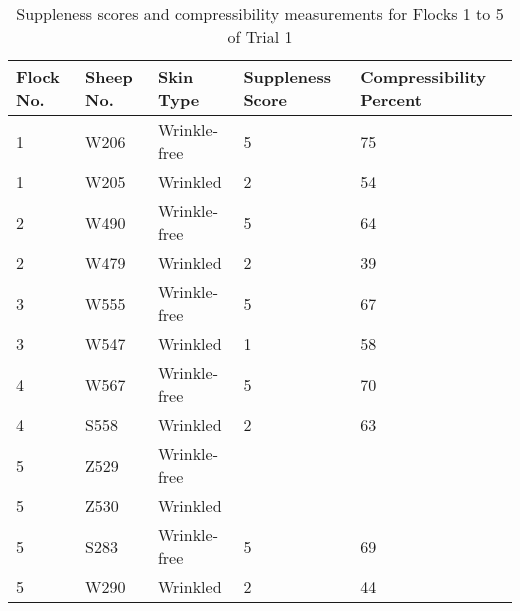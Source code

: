 %

\begin{table}[htp]
\centering
\caption{Suppleness scores and compressibility measurements for Flocks 1 to 5 of Trial 1}
\label{tab:macro}
\vspace{0.1in}
\begin{tabular}{|p{0.6in}|p{0.6in}|p{0.8in}|p{0.8in}|p{0.9in}|}  \hline
     Flock No. & Sheep No.  &  Skin Type & Suppleness Score & Compressibility Percent \\ 
\hline
  1 & W206 & Wrinkle-free & 5 & 75 \\
  1 & W205 & Wrinkled     & 2 & 54 \\
  2 & W490 & Wrinkle-free & 5 & 64 \\
  2 & W479 & Wrinkled     & 2 & 39 \\
  3 & W555 & Wrinkle-free & 5 & 67 \\
  3 & W547 & Wrinkled     & 1 & 58 \\
  4 & W567 & Wrinkle-free & 5 & 70 \\
  4 & S558 & Wrinkled     & 2 & 63 \\
  5 & Z529 & Wrinkle-free &   &    \\
  5 & Z530 & Wrinkled     &   &    \\
  5 & S283 & Wrinkle-free & 5 & 69 \\
  5 & W290 & Wrinkled     & 2 & 44 \\ \hline
\end{tabular}
\end{table}

%
